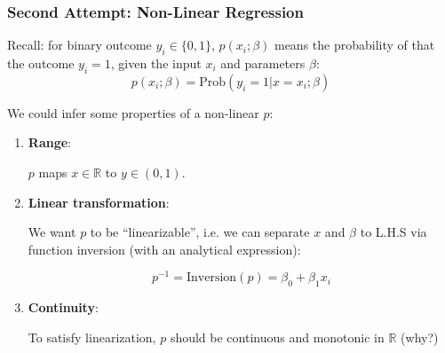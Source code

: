 \documentclass[10pt,aspectratio=169]{beamer}
\begin{document}
\begin{frame}
  \frametitle{Second Attempt: Non-Linear Regression}
  
  Recall: for binary outcome $y_{i} \in \{0, 1\}$, $p(x_{i}; \beta)$
  means the probability of that the outcome $y_{i}=1$, given the input
  $x_{i}$ and parameters $\beta$:
  \begin{equation*}
    p(x_{i}; \beta) = \mathrm{Prob}(y_{i}=1 | x=x_{i}; \beta)
  \end{equation*}

  \vspace{1em}

  We could infer some properties of a non-linear $p$:
  \begin{enumerate}
  \item \textbf{Range}:

    $p$ maps $x \in \mathbb{R}$ to $y \in (0, 1)$.
    
  \item \textbf{Linear transformation}:

    We want $p$ to be ``linearizable'', i.e. we can separate $x$ and
    $\beta$ to L.H.S via function inversion (with an analytical expression):

    \begin{equation*}
      p^{-1} = \mathrm{Inversion}(p) = \beta_{0} + \beta_{1} x_{i}
    \end{equation*}

  \item \textbf{Continuity}:

    To satisfy linearization, $p$ should be continuous and
    monotonic in $\mathbb{R}$ (why?)
    
  \end{enumerate}
  
\end{frame}
\end{document}
